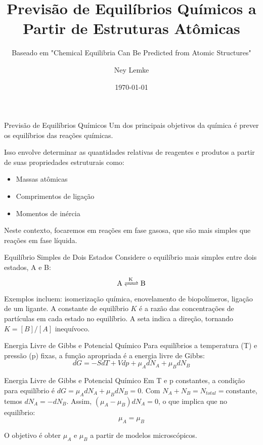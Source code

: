 \documentclass{beamer}
\title{Previsão de Equilíbrios Químicos a Partir de Estruturas Atômicas}
\subtitle{Baseado em "Chemical Equilibria Can Be Predicted from Atomic Structures"}
\author{Ney Lemke}
\date{\today}
\begin{document}
\frame{\titlepage}

\begin{frame}{Previsão de Equilíbrios Químicos}
        Um dos principais objetivos da química é prever os equilíbrios das reações químicas.
        
        Isso envolve determinar as quantidades relativas de reagentes e produtos a partir de suas propriedades estruturais como:
        \begin{itemize}
            \item Massas atômicas
            \item Comprimentos de ligação
            \item Momentos de inércia
        \end{itemize}
        
        Neste contexto, focaremos em reações em fase gasosa, que são mais simples que reações em fase líquida.
\end{frame}

\begin{frame}{Equilíbrio Simples de Dois Estados}
        Considere o equilíbrio mais simples entre dois estados, A e B:
        $$ \ce{A <=>[\text{K}] B} $$
        
        Exemplos incluem: isomerização química, enovelamento de biopolímeros, ligação de um ligante. 
        A constante de equilíbrio $K$ é a razão das concentrações de partículas em cada estado no equilíbrio.
        A seta indica a direção, tornando $K = [B]/[A]$ inequívoco.
\end{frame}

\begin{frame}{Energia Livre de Gibbs e Potencial Químico}
        Para equilíbrios a temperatura (T) e pressão (p) fixas, a função apropriada é a energia livre de Gibbs:
        $$ dG = -SdT + Vdp + \mu_A dN_A + \mu_B dN_B $$
        
\end{frame}
        
\begin{frame}{Energia Livre de Gibbs e Potencial Químico}
        Em T e p constantes, a condição para equilíbrio é $dG = \mu_A dN_A + \mu_B dN_B = 0$. 
        Com $N_A + N_B = N_{total} = \text{constante}$, temos $dN_A = -dN_B$. 
        Assim, $(\mu_A - \mu_B)dN_A = 0$, o que implica que no equilíbrio:
        $$ \mu_A = \mu_B $$
        
        O objetivo é obter $\mu_A$ e $\mu_B$ a partir de modelos microscópicos.
\end{frame}
\end{document}

